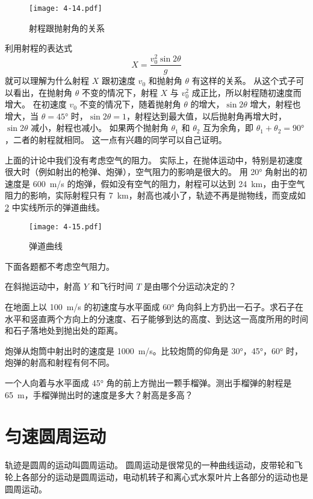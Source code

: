 \begin{figure}
  \texttt{[image: 4-14.pdf]}
  \caption{射程跟抛射角的关系}\label{fig:4-14}
\end{figure}

利用射程的表达式
\[X=\frac{v_0^2\sin 2\theta}{g} \]
就可以理解为什么射程 $X$ 跟初速度 $v_0$ 和抛射角 $\theta$ 有这样的关系。
从这个式子可以看出，在抛射角 $\theta$ 不变的情况下，射程 $X$ 与 $v^2_0$ 成正比，所以射程随初速度而增大。
在初速度 $v_0$ 不变的情况下，随着抛射角 $\theta$ 的增大，$\sin 2\theta$ 增大，射程也增大，当 $\theta=\ang{45}$ 时，$\sin 2\theta=1$，射程达到最大值，以后抛射角再增大时，$\sin 2\theta$ 减小，射程也减小。
如果两个抛射角 $\theta_1$ 和 $\theta_2$ 互为余角，即 $\theta_1+\theta_2=\ang{90}$，二者的射程就相同。
这一点有兴趣的同学可以自己证明。

上面的计论中我们没有考虑空气的阻力。
实际上，在抛体运动中，特别是初速度很大时（例如射出的枪弹、炮弹），空气阻力的影响是很大的。
用 \ang{20} 角射出的初速度是 \qty{600}{m/s} 的炮弹，假如没有空气的阻力，射程可以达到 \qty{24}{km}，由于空气阻力的影响，实际射程只有 \qty{7}{km}，射高也减小了，轨迹不再是抛物线，而变成如\cref{fig:4-15} 中实线所示的弹道曲线。

\begin{figure}
  \texttt{[image: 4-15.pdf]}
  \caption{弹道曲线}\label{fig:4-15}
\end{figure}

\begin{Practice}
下面各题都不考虑空气阻力。
\begin{question}
  \item 在斜抛运动中，射高 $Y$ 和飞行时间 $T$ 是由哪个分运动决定的？
  \item 在地面上以 \qty{100}{m/s} 的初速度与水平面成 \ang{60} 角向斜上方扔出一石子。求石子在水平和竖直两个方向上的分速度、石子能够到达的高度、到达这一高度所用的时间和石子落地处到抛出处的距离。
  \item 炮弹从炮筒中射出时的速度是 \qty{1000}{m/s}。比较炮筒的仰角是 \ang{30}，\ang{45}，\ang{60} 时，炮弹的射高和射程有何不同。
  \item 一个人向着与水平面成 \ang{45} 角的前上方抛出一颗手榴弹。测出手榴弹的射程是 \qty{65}{m}，手榴弹抛出时的速度是多大？射高是多高？
\end{question}
\end{Practice}

\section{匀速圆周运动}
轨迹是圆周的运动叫圆周运动。
圆周运动是很常见的一种曲线运动，皮带轮和飞轮上各部分的运动是圆周运动，电动机转子和离心式水泵叶片上各部分的运动也是圆周运动。


